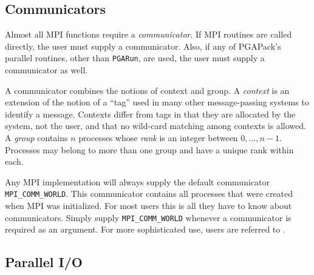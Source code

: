 \documentclass{report}
\newcommand{\pga}{PGAPack}
\begin{document}
\subsection*{Communicators}

Almost all MPI functions require a {\em communicator}.  If MPI routines are
called directly, the user must supply a communicator.  Also, if any of \pga's
parallel routines, other than {\tt PGARun}, are used, the user must supply a
communicator as well.

A communicator combines the notions of context and group.  A {\em context} is
an extension of the notion of a ``tag'' used in many other message-passing
systems to identify a message.  Contexts differ from tags in that they are
allocated by the system, not the user, and that no wild-card matching among
contexts is allowed.  A {\em group} contains $n$ processes whose {\em rank} is
an integer between $0,\ldots,n-1$.  Processes may belong to more than one
group and have a unique rank within each.

Any MPI implementation will always supply the default communicator {\tt
MPI\_COMM\_WORLD}.  This communicator contains all processes that were created
when MPI was initialized.  For most users this is all they have to know about
communicators.  Simply supply {\tt MPI\_COMM\_WORLD} whenever a communicator
is required as an argument.  For more sophisticated use, users are referred to
\cite{MPI-final,GrLuSk94}.



\subsection*{Parallel I/O}
\end{document}
